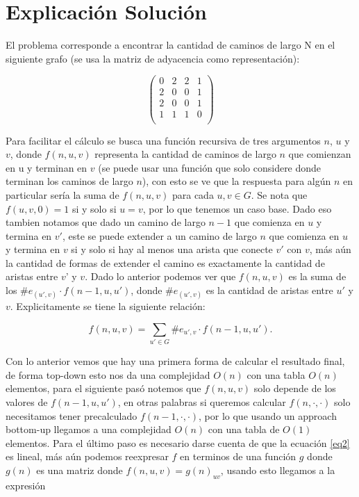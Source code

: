 \documentclass{article}
\begin{document}
    \section*{Explicación Solución}

    El problema corresponde a encontrar la cantidad de caminos de largo N en el siguiente grafo (se usa la matriz de adyacencia como representación):

    \begin{equation}\label{eq1}
        \begin{pmatrix}
            0 & 2 & 2 & 1\\
            2 & 0 & 0 & 1\\
            2 & 0 & 0 & 1\\
            1 & 1 & 1 & 0\\
        \end{pmatrix}
    \end{equation}
       

    Para facilitar el cálculo se busca una función recursiva de tres argumentos \(n\), \(u\) y \(v\), donde \(f(n,u,v)\) representa la cantidad de caminos de largo \(n\) que comienzan en u y terminan en \(v\) (se puede usar una función que solo considere donde terminan los caminos de largo \(n\)), con esto se ve que la respuesta para algún \(n\) en particular sería la suma de \(f(n,u,v)\) para cada \(u,v\in G\). Se nota que \(f(u,v,0)=1\) si y solo si \(u=v\), por lo que tenemos un caso base. Dado eso tambien notamos que dado un camino de largo \(n-1\) que comienza en \(u\) y termina en \(v'\), este se puede extender a un camino de largo \(n\) que comienza en \(u\) y termina en \(v\) si y solo si hay al menos una arista que conecte \(v'\) con \(v\), más aún la cantidad de formas de extender el camino es exactamente la cantidad de aristas entre \(v\)' y \(v\). Dado lo anterior podemos ver que \(f(n,u,v)\) es la suma de los \(\#e_{(u',v)}\cdot f(n-1,u,u')\), donde \(\#e_{(u',v)}\) es la cantidad de aristas entre \(u'\) y \(v\). Explicitamente se tiene la siguiente relación:

    \begin{equation}\label{eq2}
        f(n,u,v)=\sum_{u'\in G}\#e_{u',v}\cdot f(n-1,u,u').
    \end{equation}

    Con lo anterior vemos que hay una primera forma de calcular el resultado final, de forma top-down esto nos da una complejidad \(O(n)\) con una tabla \(O(n)\) elementos, para el siguiente pasó notemos que \(f(n,u,v)\) solo depende de los valores de \(f(n-1,u,u')\), en otras palabras si queremos calcular \(f(n,\cdot,\cdot)\) solo necesitamos tener precalculado \(f(n-1,\cdot,\cdot)\), por lo que usando un approach bottom-up llegamos a una complejidad \(O(n)\) con una tabla de \(O(1)\) elementos. Para el último paso es necesario darse cuenta de que la ecuación \eqref{eq2} es lineal, más aún podemos reexpresar \(f\) en terminos de una función \(g\) donde \(g(n)\) es una matriz donde \(f(n,u,v)=g(n)_{uv}\), usando esto llegamos a la expresión
    
\end{document}
